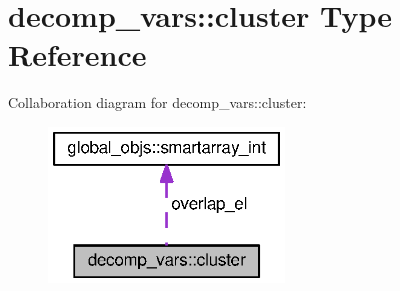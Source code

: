 \section{decomp\+\_\+vars\+:\+:cluster Type Reference}
\label{structdecomp__vars_1_1cluster}


Collaboration diagram for decomp\+\_\+vars\+:\+:cluster\+:\nopagebreak
\begin{figure}[H]
\begin{center}
\leavevmode
\includegraphics[width=178pt]{structdecomp__vars_1_1cluster__coll__graph}
\end{center}
\end{figure}
